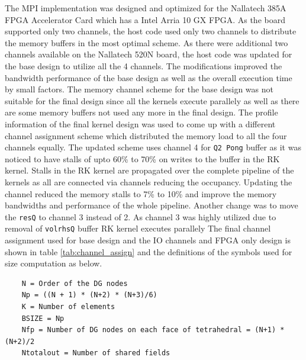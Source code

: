 The MPI implementation was designed and optimized for the Nallatech 385A FPGA Accelerator Card which has a
Intel Arria 10 GX FPGA. As the board supported only two channels, the host code used only two channels
to distribute the memory buffers in the most optimal scheme. As there were additional two channels
available on the Nallatech 520N board, the host code was updated for the base design to utilize
all the 4 channels. The modifications improved the bandwidth performance of the base design
as well as the overall execution time by small factors. The memory channel scheme
for the base design was not suitable for the final design since all the kernels execute
parallely as well as there are some memory buffers not used any more in the final design.
The profile information of the final kernel design was used to come up with a
different channel assignment scheme which distributed the memory load to all the
four channels equally. The updated scheme uses channel 4 for \texttt{Q2 Pong} buffer
as it was noticed to have stalls of upto 60\% to 70\% on writes to the buffer in the RK
kernel. Stalls in the RK kernel are propagated over the complete pipeline of the kernels
as all are connected via channels reducing the occupancy. Updating the channel reduced
the memory stalls to 7\% to 10\% and improve the memory bandwidths and performance
of the whole pipeline. Another change was to move the \texttt{resQ}
to channel 3 instead of 2. As channel 3 was highly utilized due to removal
of \texttt{volrhsQ} buffer RK kernel executes parallely The final channel assignment used for base design and the IO channels and
FPGA only design is shown in table \ref{tab:channel_assign} and the definitions of the symbols used for size computation as below.
\begin{verbatim}
    N = Order of the DG nodes
    Np = ((N + 1) * (N+2) * (N+3)/6)
    K = Number of elements
    BSIZE = Np
    Nfp = Number of DG nodes on each face of tetrahedral = (N+1) * (N+2)/2
    Ntotalout = Number of shared fields
\end{verbatim}
